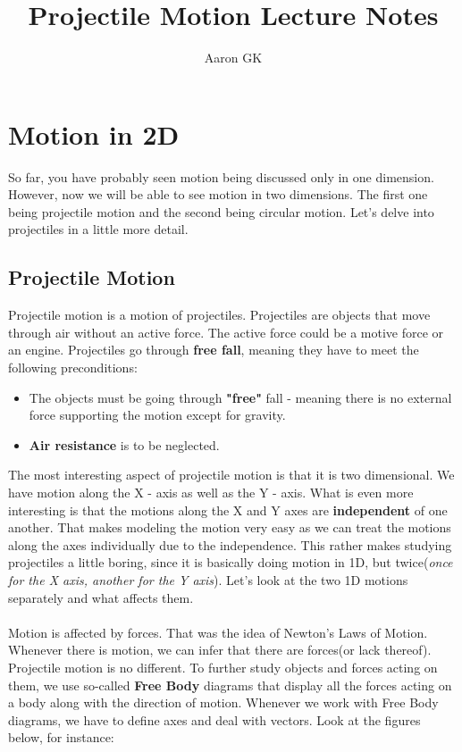 \documentclass[9pt]{article}
\title{Projectile Motion Lecture Notes}
\author{Aaron GK}
\begin{document}
	\maketitle
	\section*{Motion in 2D}
	So far, you have probably seen motion being discussed only in one dimension. However, now we will be able to see motion in two dimensions. The first one being projectile motion and the second being circular motion. Let's delve into projectiles in a little more detail.
	\subsection*{Projectile Motion} 
	Projectile motion is a motion of projectiles. Projectiles are objects that move through air without an active force. The active force could be a motive force or an engine. Projectiles go through \textbf{free fall}, meaning they have to meet the following preconditions:
	\begin{itemize}
		\item The objects must be going through \textbf{"free"} fall - meaning there is no external force supporting the motion except for gravity.
		\item \textbf{Air resistance} is to be neglected. 
	\end{itemize}
	The most interesting aspect of projectile motion is that it is two dimensional. We have motion along the X - axis as well as the Y - axis. What is even more interesting is that the motions along the X and Y axes are \textbf{independent} of one another. That makes modeling the motion very easy as we can treat the motions along the axes individually due to the independence. This rather makes studying projectiles a little boring, since it is basically doing motion in 1D, but twice(\textit{once for the X axis, another for the Y axis}). Let's look at the two 1D motions separately and what affects them. \\ \\
	Motion is affected by forces. That was the idea of Newton's Laws of Motion. Whenever there is motion, we can infer that there are forces(or lack thereof). Projectile motion is no different. To further study objects and forces acting on them, we use so-called \textbf{Free Body} diagrams that display all the forces acting on a body along with the direction of motion. Whenever we work with Free Body diagrams, we have to define axes and deal with vectors. Look at the figures below, for instance:
\end{document}
